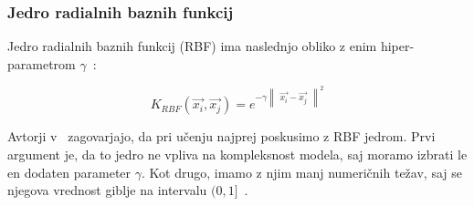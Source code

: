 \subsubsection{Jedro radialnih baznih funkcij}{
Jedro radialnih baznih funkcij (RBF) ima naslednjo obliko z enim hiper-parametrom $\gamma$~\cite{hsu2003practical}:

\begin{equation} \label{eq:rbf-kernel}
		K_{RBF}(\vec{x_i}, \vec{x_j}) = e^{
        	-\gamma 
        	\begin{Vmatrix}
        		\vec{x_i} - \vec{x_j}
        	\end{Vmatrix}^2
        }
\end{equation}

Avtorji v~\cite{hsu2003practical} zagovarjajo, da pri učenju najprej poskusimo z RBF jedrom. Prvi argument je, da to jedro ne vpliva na kompleksnost modela, saj moramo izbrati le en dodaten parameter $\gamma$. Kot drugo, imamo z njim manj numeričnih težav, saj se njegova vrednost giblje na intervalu $(0, 1]$~\cite{hsu2003practical}. 


\begin{comment}
\subsubsection{Jedro preseka generaliziranih histogramov}\label{sec:ghi}
Jedro preseka generaliziranih histogramov (GHI) je uporaben, ko imamo deskriptorje definirane kot histograme. Določen z enačbo~\eqref{eq:ghi-kernel}, kjer je hiper-parameter $\beta \geq 0$, $m$ pa je število stolpcev histogramov $\vec{x}$ in $\vec{x}'$~\cite{boughorbel2005generalized}.

\begin{equation}\label{eq:ghi-kernel}
K_{GHI}(\vec{x}, \vec{x}') = \sum_{i=1}^m min\left\{ \left| x_i \right|^\beta, \left|  x_i' \right| \right\}
\end{equation}

Po~\cite{boughorbel2005generalized} je prednost uporabe GHI jedra ta, da so meje invariantne na skaliranje prostora značilk, zato ne potrebujemo dodatne optimizacije skalirnega hiper-parametra. Optimalna vrednosti hiper-parametra je okoli $\beta=0.25$.

\end{comment}





}
